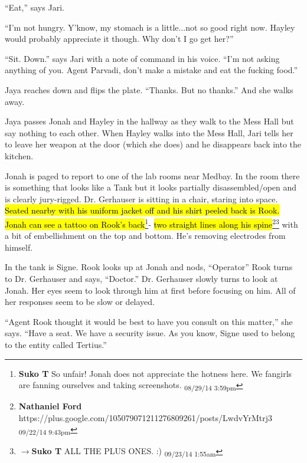 ``Eat,'' says Jari.

``I'm not hungry.  Y'know, my stomach is a little...not so good right now.  Hayley would probably appreciate it though.  Why don't I go get her?''

``Sit.  Down.'' says Jari with a note of command in his voice.  ``I'm not asking anything of you.  Agent Parvadi, don't make a mistake and eat the fucking food.''

Jaya reaches down and flips the plate.  ``Thanks.  But no thanks.'' And she walks away.



Jaya passes Jonah and Hayley in the hallway as they walk to the Mess Hall but say nothing to each other.  When Hayley walks into the Mess Hall, Jari tells her to leave her weapon at the door (which she does) and he disappears back into the kitchen.





Jonah is paged to report to one of the lab rooms near Medbay.  In the room there is something that looks like a Tank but it looks partially disassembled/open and is clearly jury-rigged.  Dr. Gerhauser is sitting in a chair, staring into space.  \hl{Seated nearby with his uniform jacket off and his shirt peeled back is Rook.  Jonah can see a tattoo on Rook's back}\footnote{\textbf{Suko T }So unfair!  Jonah does not appreciate the hotness here.  We fangirls are fanning ourselves and taking screenshots. \textsubscript{08/29/14 3:59pm}}- \hl{two straight lines along his spine}\footnote{\textbf{Nathaniel Ford }https://plus.google.com/105079071211276809261/posts/LwdvYrMtrj3 \textsubscript{09/22/14 9:43pm}}\footnote{$\rightarrow$\textbf{Suko T }ALL THE PLUS ONES. :) \textsubscript{09/23/14 1:55am}} with a bit of embellishment on the top and bottom.  He's removing electrodes from himself.  



In the tank is Signe.  Rook looks up at Jonah and nods, ``Operator''  Rook turns to Dr. Gerhauser and says, ``Doctor.''  Dr. Gerhauser slowly turns to look at Jonah.  Her eyes seem to look through him at first before focusing on him.  All of her responses seem to be slow or delayed.



``Agent Rook thought it would be best to have you consult on this matter,'' she says.  ``Have a seat.  We have a security issue.  As you know, Signe used to belong to the entity called Tertius.''

